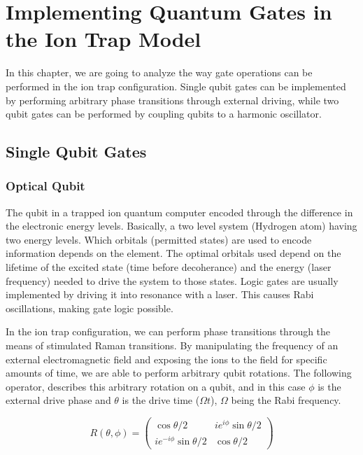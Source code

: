 \documentclass[../main.tex]{subfiles}
\begin{document}
\chapter{Implementing Quantum Gates in the Ion Trap Model}

\tab In this chapter, we are going to analyze the way gate operations can be performed in the ion trap configuration. Single qubit gates can be implemented by performing arbitrary phase transitions through external driving, while two qubit gates can be performed by coupling 
qubits to a harmonic oscillator. 

\section{Single Qubit Gates}

\subsection{Optical Qubit}
The qubit in a trapped ion quantum computer encoded through the difference in the electronic energy levels. Basically, a two level system (Hydrogen atom) having two energy levels. Which orbitals (permitted states) are used to encode information depends on the element. The optimal orbitals used depend on the lifetime of the excited state (time before decoherance) and the energy (laser frequency) needed to drive the system to those states.
Logic gates are usually implemented by driving it into resonance with a laser. This causes Rabi oscillations, making gate logic possible.
\par
In the ion trap configuration, we can perform phase transitions through the means of stimulated Raman transitions. By manipulating the frequency of an external electromagnetic field and exposing the ions to the field for specific amounts of time, we are able to perform arbitrary qubit rotations. The following operator, describes this arbitrary rotation on a qubit, and in this case $\phi$ is the external drive phase and $\theta$ is the drive time ($\Omega t$), $\Omega$ being the Rabi frequency.

\begin{equation}
    R(\theta, \phi) = \begin{pmatrix}
        \cos{\theta/2} &ie^{i\phi}\sin{\theta/2}\\
        ie^{-i\phi}\sin{\theta/2} &\cos{\theta/2}
    \end{pmatrix}
\end{equation}
\end{document}
